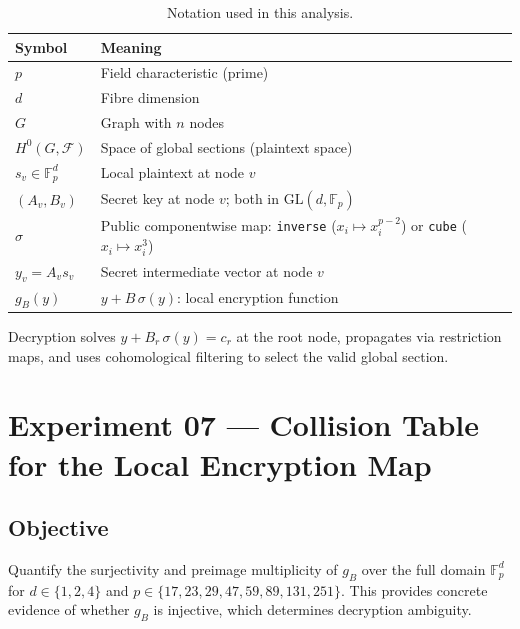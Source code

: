 \documentclass[12pt,a4paper]{article}
\theoremstyle{definition}
\newcommand{\Fp}{\mathbb{F}_p}
\newcommand{\GL}{\mathrm{GL}}
\newcommand{\Hzero}{H^{0}}
\newcommand{\calF}{\mathcal{F}}
\begin{document}
\begin{table}[h]
\centering
\caption{Notation used in this analysis.}
\label{tab:notation}
\begin{tabularx}{\linewidth}{>{\ttfamily}lX}
\toprule
\normalfont Symbol & Meaning \\
\midrule
$p$                & Field characteristic (prime) \\
$d$                & Fibre dimension \\
$G$                & Graph with $n$ nodes \\
$\Hzero(G, \calF)$ & Space of global sections (plaintext space) \\
$s_v \in \Fp^d$    & Local plaintext at node $v$ \\
$(A_v, B_v)$       & Secret key at node $v$; both in $\GL(d,\Fp)$ \\
$\sigma$           & Public componentwise map:
                     \texttt{inverse} ($x_i \mapsto x_i^{p-2}$)
                     or \texttt{cube} ($x_i \mapsto x_i^3$) \\
$y_v = A_v s_v$    & Secret intermediate vector at node $v$ \\
$g_B(y)$           & $y + B\,\sigma(y)$: local encryption function \\
\bottomrule
\end{tabularx}
\end{table}

Decryption solves $y + B_r\,\sigma(y) = c_r$ at the root node,
propagates via restriction maps, and uses cohomological filtering to
select the valid global section.

\section{Experiment 07 --- Collision Table for the Local Encryption Map}

\subsection{Objective}

Quantify the surjectivity and preimage multiplicity of $g_B$ over the
full domain $\Fp^d$ for $d \in \{1, 2, 4\}$ and
$p \in \{17, 23, 29, 47, 59, 89, 131, 251\}$.
This provides concrete evidence of whether $g_B$ is injective, which
determines decryption ambiguity.
\end{document}
